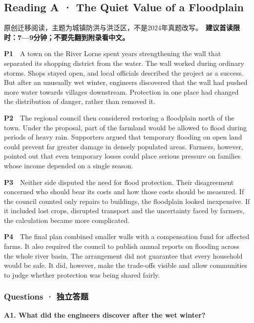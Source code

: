 \documentclass[
  11pt,
]{ctexart}
\begin{document}
\subsection{Reading A · The Quiet Value of a
Floodplain}\label{reading-a-the-quiet-value-of-a-floodplain}

原创迁移阅读，主题为城镇防洪与洪泛区，不是2024年真题改写。　\textbf{建议首读限时：7---9分钟；不要先翻到附录看中文。}

\textbf{P1}　A town on the River Lorne spent years strengthening the
wall that separated its shopping district from the water. The wall
worked during ordinary storms. Shops stayed open, and local officials
described the project as a success. But after an unusually wet winter,
engineers discovered that the wall had pushed more water towards
villages downstream. Protection in one place had changed the
distribution of danger, rather than removed it.

\textbf{P2}　The regional council then considered restoring a floodplain
north of the town. Under the proposal, part of the farmland would be
allowed to flood during periods of heavy rain. Supporters argued that
temporary flooding on open land could prevent far greater damage in
densely populated areas. Farmers, however, pointed out that even
temporary losses could place serious pressure on families whose income
depended on a single season.

\textbf{P3}　Neither side disputed the need for flood protection. Their
disagreement concerned who should bear its costs and how those costs
should be measured. If the council counted only repairs to buildings,
the floodplain looked inexpensive. If it included lost crops, disrupted
transport and the uncertainty faced by farmers, the calculation became
more complicated.

\textbf{P4}　The final plan combined smaller walls with a compensation
fund for affected farms. It also required the council to publish annual
reports on flooding across the whole river basin. The arrangement did
not guarantee that every household would be safe. It did, however, make
the trade-offs visible and allow communities to judge whether protection
was being shared fairly.

\subsubsection{Questions ·
独立答题}\label{questions-ux72ecux7acbux7b54ux9898}

\textbf{A1. What did the engineers discover after the wet winter?}
\end{document}
